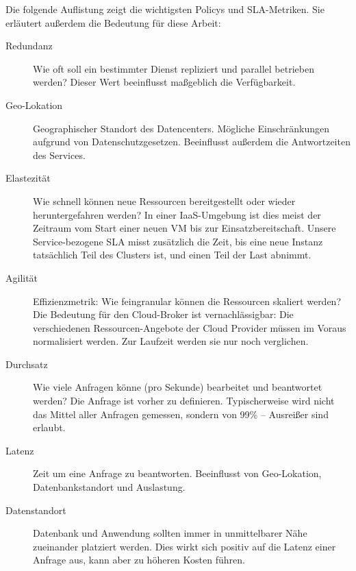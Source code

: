 Die folgende Auflistung zeigt die wichtigsten Policys und SLA-Metriken. Sie erläutert außerdem die Bedeutung für diese Arbeit:

\begin{description}
	

	\item[Redundanz] Wie oft soll ein bestimmter Dienst repliziert und parallel betrieben werden? Dieser Wert beeinflusst maßgeblich die Verfügbarkeit.

	
	\item[Geo-Lokation] Geographischer Standort des Datencenters. Mögliche Einschränkungen aufgrund von Datenschutzgesetzen. Beeinflusst außerdem die Antwortzeiten des Services.

	\item[Elastezität] Wie schnell können neue Ressourcen bereitgestellt oder wieder heruntergefahren werden? In einer IaaS-Umgebung ist dies meist der Zeitraum vom Start einer neuen VM bis zur Einsatzbereitschaft. Unsere Service-bezogene SLA misst zusätzlich die Zeit, bis eine neue Instanz tatsächlich Teil des Clusters ist, und einen Teil der Last abnimmt.
	
	\item[Agilität] Effizienzmetrik: Wie feingranular können die Ressourcen skaliert werden? Die Bedeutung für den Cloud-Broker ist vernachlässigbar:  Die verschiedenen Ressourcen-Angebote der Cloud Provider müssen im Voraus normalisiert werden. Zur Laufzeit werden sie nur noch verglichen.
	
	\item[Durchsatz] Wie viele Anfragen könne (pro Sekunde) bearbeitet und beantwortet werden? Die Anfrage ist vorher zu definieren. Typischerweise wird nicht das Mittel aller Anfragen gemessen, sondern von 99\% -- Ausreißer sind erlaubt.
	
	\item[Latenz] Zeit um eine Anfrage zu beantworten. Beeinflusst von Geo-Lokation, Datenbankstandort und Auslastung.
	
	\item[Datenstandort] Datenbank und Anwendung sollten immer in unmittelbarer Nähe zueinander platziert werden. Dies wirkt sich positiv auf die Latenz einer Anfrage aus, kann aber zu höheren Kosten führen.
	

\end{description}
